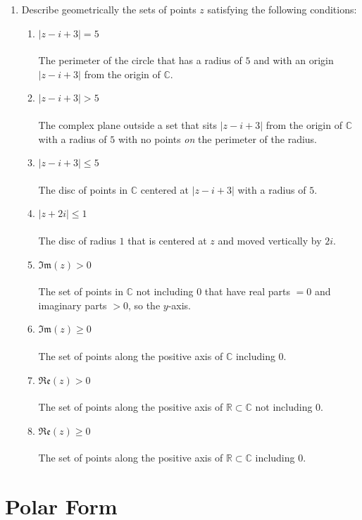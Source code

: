 \begin{enumerate}
	\item Describe geometrically the sets of points $z$ satisfying the following conditions:
	\begin{enumerate}
		\item $|z - i + 3| = 5$ \\
		\\
		The perimeter of the circle that has a radius of $5$ and with an origin $|z - i + 3|$ from the origin of $\mathbb{C}.$
		\item $|z - i + 3| > 5$ \\
		\\
		The complex plane outside a set that sits $|z -i + 3|$ from the origin of $\mathbb{C}$ with a radius of $5$ with 
		no points \textit{on} the perimeter of the radius.
		\item $|z - i + 3| \leq 5$ \\
		\\
		The disc of points in $\mathbb{C}$ centered at $|z - i + 3|$ with a radius of $5.$
		\item $|z + 2i| \leq 1$ \\
		\\
		The disc of radius $1$ that is centered at $z$ and moved vertically by $2i.$
		\item $\mathfrak{Im}(z) > 0$ \\
		\\
		The set of points in $\mathbb{C}$ not including $0$ that have real parts $= 0$ and imaginary parts $>0$, so the $y$-axis.
		\item $\mathfrak{Im}(z) \geq 0$ \\
		\\
		The set of points along the positive axis of $\mathbb{C}$ including $0.$
		\item $\mathfrak{Re}(z) > 0$ \\
		\\
		The set of points along the positive axis of $\mathbb{R} \subset \mathbb{C}$ not including $0.$
		\item $\mathfrak{Re}(z) \geq 0$ \\
		\\
		The set of points along the positive axis of $\mathbb{R} \subset \mathbb{C}$ including $0.$
	\end{enumerate}
\end{enumerate}


\section{Polar Form}

